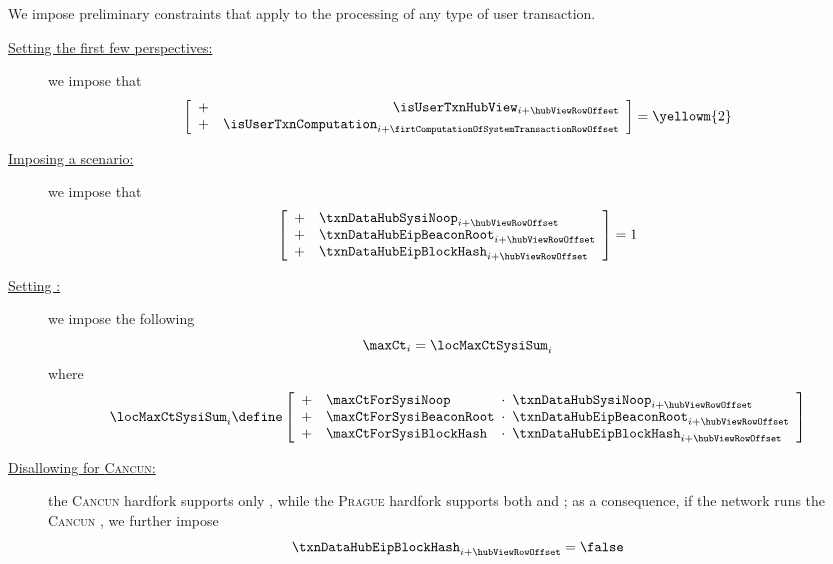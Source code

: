 \begin{center}
\end{center}
We impose preliminary constraints that apply to the processing of any type of user transaction.
\begin{description}
	\item[\underline{Setting the first few perspectives:}]
		we impose that
		\[
			\left[ \begin{array}{cr}
				+ & \isUserTxnHubView     _{i + \hubViewRowOffset                            } \\
				+ & \isUserTxnComputation _{i + \firtComputationOfSystemTransactionRowOffset } \\
			\end{array} \right]
			=
			\yellowm{2}
		\]
	\item[\underline{Imposing a scenario:}]
		we impose that
		\[
			\left[ \begin{array}{clcl}
				+ & \txnDataHubSysiNoop       _{i + \hubViewRowOffset} \\
				+ & \txnDataHubEipBeaconRoot  _{i + \hubViewRowOffset} \\
				+ & \txnDataHubEipBlockHash   _{i + \hubViewRowOffset} \\
			\end{array} \right]
			= 1
		\]
	\item[\underline{Setting \maxCt{}:}]
		we impose the following
		\[
			\maxCt _{i} = \locMaxCtSysiSum _{i}
		\]
		where
		\[
			\locMaxCtSysiSum _{i}
			\define
			\left[ \begin{array}{clcl}
				+ & \maxCtForSysiNoop       & \!\!\!\cdot\!\!\! & \txnDataHubSysiNoop       _{i + \hubViewRowOffset} \\
				+ & \maxCtForSysiBeaconRoot & \!\!\!\cdot\!\!\! & \txnDataHubEipBeaconRoot  _{i + \hubViewRowOffset} \\
				+ & \maxCtForSysiBlockHash  & \!\!\!\cdot\!\!\! & \txnDataHubEipBlockHash   _{i + \hubViewRowOffset} \\
			\end{array} \right]
		\]
	\item[\underline{Disallowing \cite{EIP-2935} for \textsc{Cancun}:}]
		\label{txn data: processing: sysi: prelude: Cancun vs Prague}
		the \textsc{Cancun} hardfork supports only \cite{EIP-4788}, while
		the \textsc{Prague} hardfork supports both \cite{EIP-4788} and \cite{EIP-2935};
		as a consequence, if the network runs the \textsc{Cancun} \evm{},
		we further impose
		\[
			\txnDataHubEipBlockHash   _{i + \hubViewRowOffset} = \false
		\]
\end{description}
